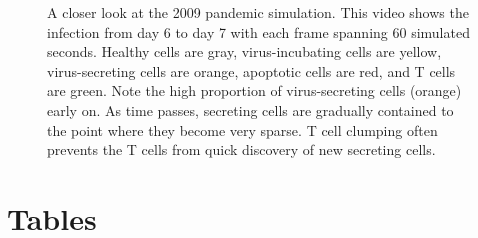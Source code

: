 \documentclass[10pt]{article}
\begin{document}
\begin{figure}[ht!]
\caption{A closer look at the 2009 pandemic simulation.  This video shows the infection from day 6 to day 7 with each frame spanning 60 simulated seconds.  Healthy cells are gray, virus-incubating cells are yellow, virus-secreting cells are orange, apoptotic cells are red, and T cells are green.  Note the high proportion of virus-secreting cells (orange) early on.  As time passes, secreting cells are gradually contained to the point where they become very sparse.  T cell clumping often prevents the T cells from quick discovery of new secreting cells.}
\end{figure}

\pagebreak

\section*{Tables}
\end{document}
